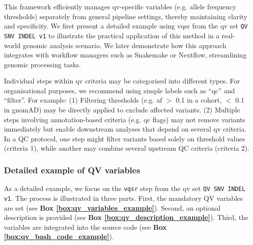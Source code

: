 This framework efficiently manages \ac{qv}-specific variables (e.g. allele frequency thresholds) separately from general pipeline settings, thereby maintaining clarity and specificity. We first present a detailed example using \ac{vqsr} from the \ac{qv} set \colorbox{colorSUNSET2!60}{\texttt{QV SNV INDEL v1}} to illustrate the practical application of this method in a real-world genomic analysis scenario. We later demonstrate how this approach integrates with workflow managers such as Snakemake or Nextflow, streamlining genomic processing tasks.


Individual steps within \ac{qv} criteria may be categorised into different types. For organisational purposes, we recommend using simple labels such as ``\ac{qc}'' and ``filter''. For example: (1) Filtering thresholds (e.g. \ac{af} $>$ 0.1 in a cohort, $<$ 0.1 in gnomAD) may be directly applied to exclude affected variants. (2) Multiple steps involving annotation-based criteria (e.g. \ac{qc} flags) may not remove variants immediately but enable downstream analyses that depend on several \ac{qv} criteria.
In a QC protocol, one step might filter variants based solely on threshold values (criteria 1), while another may combine several upstream QC criteria (criteria 2).

\subsubsection{Detailed example of QV variables}\label{sec:protocol_variables_example}
As a detailed example, we focus on the \colorbox{kispiblue!30}{\texttt{vqsr}} step from the \ac{qv} set \colorbox{colorSUNSET2!60}{\texttt{QV SNV INDEL v1}}. The process is illustrated in three parts.
First, the mandatory QV variables are set (see \textbf{Box \ref{box:qv_variables_example}}).
Second, an optional description is provided (see \textbf{Box \ref{box:qv_description_example}}).
Third, the variables are integrated into the source code (see \textbf{Box \ref{box:qv_bash_code_example}}).


